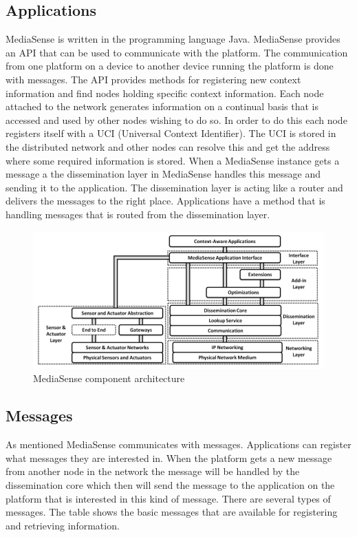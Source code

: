 \subsection{Applications}
MediaSense is written in the programming language Java. MediaSense provides an API that can be used to communicate with the platform. The communication from one platform on a device to another device running the platform is done with messages. The API provides methods for registering new context information and find nodes holding specific context information. Each node attached to the network generates information on a continual basis that is accessed and used by other nodes wishing to do so. In order to do this each node registers itself with a UCI (Universal Context Identifier). The UCI is stored in the distributed network and other nodes can resolve this and get the address where some required information is stored. When a MediaSense instance gets a message a the dissemination layer in MediaSense  handles this message and sending it to the application. The dissemination layer is acting like a router and delivers the messages to the right place. Applications have a method that is handling messages that is routed from the dissemination layer. 

\begin{figure}[H]
	\centering
    	\includegraphics[scale=0.50]{part_2/mediasense/ms_arch.png}
		\caption{MediaSense component architecture \cite{Kanter539187} }
\end{figure}

\subsection{Messages}
As mentioned MediaSense communicates with messages. Applications can register what messages they are interested in. When the platform gets a new message from another node in the network the message will be handled by the dissemination core which then will send the message to the application on the platform that is interested in this kind of message. There are several types of messages. The table shows the basic messages that are available for registering and retrieving information. 

